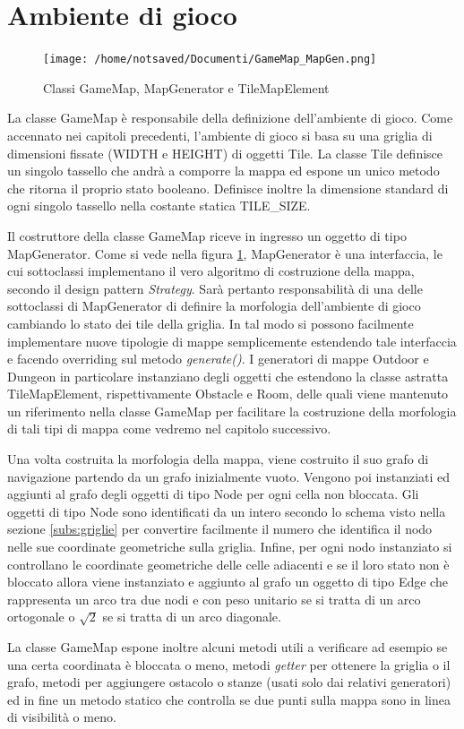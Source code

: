 \documentclass[12pt]{book}
\begin{document}
\section{Ambiente di gioco}
\begin{figure}[H]
\centering
\texttt{[image: /home/notsaved/Documenti/GameMap\_MapGen.png]}
\caption{Classi GameMap, MapGenerator e TileMapElement}
\label{gamemapclass}
\end{figure}
\par{La classe GameMap \`e responsabile della definizione dell'ambiente di gioco. Come accennato nei capitoli precedenti, l'ambiente di gioco si basa su una griglia di dimensioni fissate (WIDTH e HEIGHT) di oggetti Tile. La classe Tile definisce un singolo tassello che andr\`a a comporre la mappa ed espone un unico metodo che ritorna il proprio stato booleano. Definisce inoltre la dimensione standard di ogni singolo tassello nella costante statica TILE\_SIZE.}
\par{Il costruttore della classe GameMap riceve in ingresso un oggetto di tipo MapGenerator. Come si vede nella figura \ref{gamemapclass}, MapGenerator \`e una interfaccia, le cui sottoclassi implementano il vero algoritmo di costruzione della mappa, secondo il design pattern \emph{Strategy}. Sar\`a pertanto responsabilit\`a di una delle sottoclassi di MapGenerator di definire la morfologia dell'ambiente di gioco cambiando lo stato dei tile della griglia. In tal modo si possono facilmente implementare nuove tipologie di mappe semplicemente estendendo tale interfaccia e facendo overriding sul metodo \emph{generate()}. I generatori di mappe Outdoor e Dungeon in particolare instanziano degli oggetti che estendono la classe astratta TileMapElement, rispettivamente Obstacle e Room, delle quali viene mantenuto un riferimento nella classe GameMap per facilitare la costruzione della morfologia di tali tipi di mappa come vedremo nel capitolo successivo.}
\par{Una volta costruita la morfologia della mappa, viene costruito il suo grafo di navigazione partendo da un grafo inizialmente vuoto. Vengono poi instanziati ed aggiunti al grafo degli oggetti di tipo Node per ogni cella non bloccata. Gli oggetti di tipo Node sono identificati da un intero secondo lo schema visto nella sezione \ref{subs:griglie} per convertire facilmente il numero che identifica il nodo nelle sue coordinate geometriche sulla griglia. Infine, per ogni nodo instanziato si controllano le coordinate geometriche delle celle adiacenti e se il loro stato non \`e bloccato allora viene instanziato e aggiunto al grafo un oggetto di tipo Edge che rappresenta un arco tra due nodi e con peso unitario se si tratta di un arco ortogonale o $\sqrt2$ se si tratta di un arco diagonale.}
\par{La classe GameMap espone inoltre alcuni metodi utili a verificare ad esempio se una certa coordinata \`e bloccata o meno, metodi \emph{getter} per ottenere la griglia o il grafo, metodi per aggiungere ostacolo o stanze (usati solo dai relativi generatori) ed in fine un metodo statico che controlla se due punti sulla mappa sono in linea di visibilit\`a o meno.}
\end{document}
